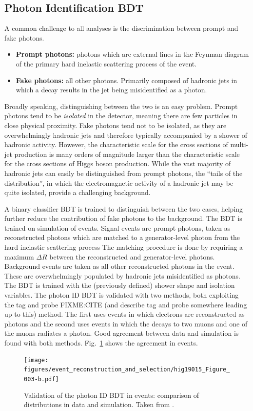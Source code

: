\subsection{Photon Identification BDT} \label{sec:evt_photon_idmva}
A common challenge to all \Hgg analyses is the discrimination between prompt and fake photons.
\begin{itemize}
    \item \textbf{Prompt photons:} photons which are external lines in the Feynman diagram of the primary hard inelastic scattering process of the event.
    \item \textbf{Fake photons:} all other photons. Primarily composed of hadronic jets in which a \Pigg decay results in the jet being misidentified as a photon.
\end{itemize}
Broadly speaking, distinguishing between the two is an easy problem.
Prompt photons tend to be \emph{isolated} in the detector, meaning there are few particles in close physical proximity.
Fake photons tend not to be isolated, as they are overwhelmingly hadronic jets and therefore typically accompanied by a shower of hadronic activity.
However, the characteristic scale for the cross sections of multi-jet production is many orders of magnitude larger than the characteristic scale for the cross sections of Higgs boson production.
While the vast majority of hadronic jets can easily be distinguished from prompt photons, the ``tails of the distribution'', in which the electromagnetic activity of a hadronic jet may be quite isolated, provide a challenging background.

A binary classifier BDT is trained to distinguish between the two cases, helping further reduce the contribution of fake photons to the background.
The BDT is trained on simulation of \gjets events.
Signal events are prompt photons, taken as reconstructed photons which are matched to a generator-level photon from the hard inelastic scattering process
The matching procedure is done by requiring a maximum $\Delta R$ between the reconstructed and generator-level photons.
Background events are taken as all other reconstructed photons in the event.
These are overwhelmingly populated by hadronic jets misidentified as photons.
The BDT is trained with the (previously defined) shower shape and isolation variables.
The photon ID BDT is validated with two methods, both exploiting the tag and probe FIXME:CITE (and describe tag and probe somewhere leading up to this) method.
The first uses \Zee events in which electrons are reconstructed as photons and the second uses \Zuug events in which the \PZ decays to two muons and one of the muons radiates a photon.
Good agreement between data and simulation is found with both methods. Fig.~\ref{fig:photon_idmva} shows the agreement in \Zee events.
\begin{figure} [h!]
    \centering
    \texttt{[image: figures/event\_reconstruction\_and\_selection/hig19015\_Figure\_003-b.pdf]}
    \caption{Validation of the photon ID BDT in \Zee events: comparison of distributions in data and simulation. Taken from \cite{CMS:2020omd}.}
    \label{fig:photon_idmva}
\end{figure}

